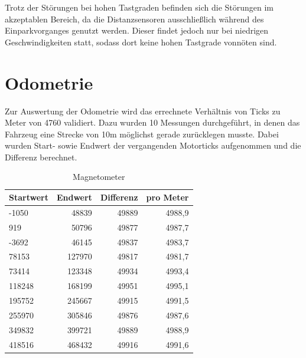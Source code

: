 
Trotz der Störungen bei hohen Tastgraden befinden sich die Störungen im akzeptablen Bereich, da die Distanzsensoren ausschließlich während des Einparkvorganges
genutzt werden. Dieser findet jedoch nur bei niedrigen Geschwindigkeiten statt, sodass dort keine hohen Tastgrade vonnöten sind.


\section{Odometrie}

Zur Auswertung der Odometrie wird das errechnete Verhältnis von Ticks zu Meter von 4760 validiert. Dazu wurden 10 Messungen durchgeführt, in denen das Fahrzeug
eine Strecke von 10m möglichst gerade zurücklegen musste. Dabei wurden Start- sowie Endwert der vergangenden Motorticks aufgenommen und die Differenz berechnet.

\begin{table}[H]
  \centering
  \begin{tabularx}{\textwidth}{|X|r|r|r|}
    \hline
     Startwert & Endwert & Differenz  & pro Meter \\ \hline \hline
    -1050	& 48839		& 49889	& 4988,9\\ \hline
      919	& 50796		& 49877	& 4987,7\\ \hline
    -3692	& 46145		& 49837	& 4983,7\\ \hline
    78153	& 127970	& 49817	& 4981,7\\ \hline
    73414	& 123348	& 49934	& 4993,4\\ \hline
    118248	& 168199	& 49951	& 4995,1\\ \hline
    195752	& 245667	& 49915	& 4991,5\\ \hline
    255970	& 305846	& 49876	& 4987,6\\ \hline
    349832	& 399721	& 49889	& 4988,9\\ \hline
    418516	& 468432	& 49916	& 4991,6\\ \hline
  \end{tabularx}
  \caption{Magnetometer}%
  \label{tab:odom}
\end{table}

